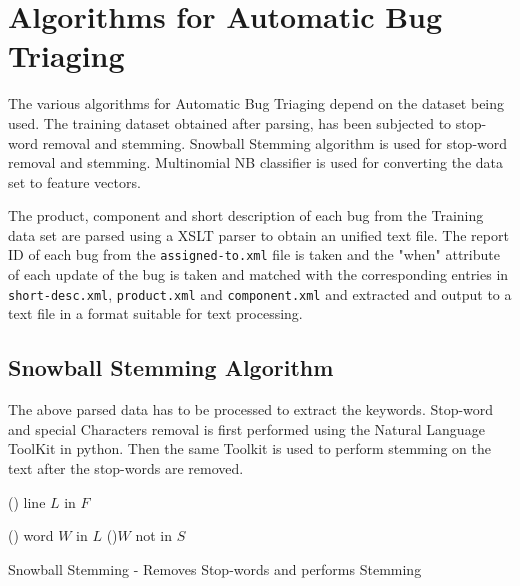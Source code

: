 
\chapter{Algorithms for Automatic Bug Triaging}
The various algorithms for Automatic Bug Triaging depend on the dataset being used. The training dataset obtained after parsing, has been subjected to stop-word removal and stemming. Snowball Stemming algorithm is used for stop-word removal and stemming. Multinomial NB classifier is used for converting the data set to feature vectors. 

The product, component and short description of each bug from the Training data set are parsed using a XSLT parser to obtain an unified text file. The report ID of each bug from the \texttt{assigned-to.xml} file is taken and the "when" attribute of each update of the bug is taken and matched with the corresponding entries in \texttt{short-desc.xml}, \texttt{product.xml} and \texttt{component.xml} and extracted and output to a text file in a format suitable for text processing.




\section{Snowball Stemming Algorithm}
The above parsed data has to be processed to extract the keywords. Stop-word and special Characters removal is first performed using the Natural Language ToolKit in python. Then the same Toolkit is used to perform stemming on the text after the stop-words are removed. 

\begin{algorithm}[H]
	\DontPrintSemicolon %
	\ForEach(){ line $L$ in $F$} { 
		\ForEach(){ word $W$ in $L$}{
			\If(){$W$ not in  $S$} {
		 \;
	}
		}
	
	}
	\;
	\caption{{\sc Snowball Stemming} - Removes Stop-words and performs Stemming}
	\label{algo:Snowball Stemming}
\end{algorithm}


